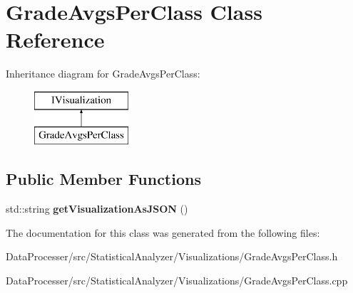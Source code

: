 \hypertarget{classGradeAvgsPerClass}{}\section{Grade\+Avgs\+Per\+Class Class Reference}
\label{classGradeAvgsPerClass}
Inheritance diagram for Grade\+Avgs\+Per\+Class\+:\begin{figure}[H]
\begin{center}
\leavevmode
\includegraphics[height=2.000000cm]{classGradeAvgsPerClass}
\end{center}
\end{figure}
\subsection*{Public Member Functions}
\begin{DoxyCompactItemize}
\item 
\mbox{\label{classGradeAvgsPerClass_ab87b0c0c7365150ff345cbf49af916da}} 
std\+::string {\bfseries get\+Visualization\+As\+J\+S\+ON} ()
\end{DoxyCompactItemize}


The documentation for this class was generated from the following files\+:\begin{DoxyCompactItemize}
\item 
Data\+Processer/src/\+Statistical\+Analyzer/\+Visualizations/Grade\+Avgs\+Per\+Class.\+h\item 
Data\+Processer/src/\+Statistical\+Analyzer/\+Visualizations/Grade\+Avgs\+Per\+Class.\+cpp\end{DoxyCompactItemize}
